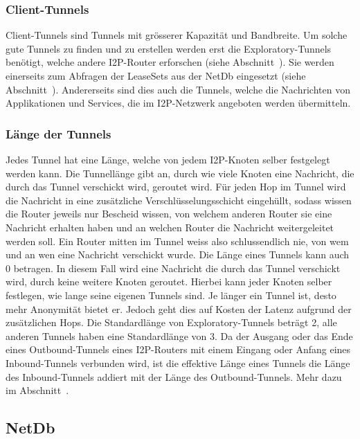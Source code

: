 \subsubsection{Client-Tunnels}

Client-Tunnels sind Tunnels mit grösserer Kapazität und Bandbreite. Um solche gute Tunnels zu finden und zu erstellen werden erst die Exploratory-Tunnels benötigt, welche andere I2P-Router erforschen (siehe Abschnitt~).
Sie werden einerseits zum Abfragen der LeaseSets aus der NetDb eingesetzt (siehe Abschnitt~).
Andererseits sind dies auch die Tunnels, welche die Nachrichten von Applikationen und Services, die im I2P-Netzwerk angeboten werden übermitteln.
\parencites[S.~4]{conrad_survey_2014}{noauthor_tunnelimplementierung_nodate}

\subsubsection{Länge der Tunnels}

Jedes Tunnel hat eine Länge, welche von jedem I2P-Knoten selber festgelegt werden kann.
Die Tunnellänge gibt an, durch wie viele Knoten eine Nachricht, die durch das Tunnel verschickt wird, geroutet wird.
Für jeden Hop im Tunnel wird die Nachricht in eine zusätzliche Verschlüsselungsschicht eingehüllt,
sodass wissen die Router jeweils nur Bescheid wissen, von welchem anderen Router sie eine Nachricht erhalten haben und an welchen Router die Nachricht weitergeleitet werden soll.
Ein Router mitten im Tunnel weiss also schlussendlich nie, von wem und an wen eine Nachricht verschickt wurde.
Die Länge eines Tunnels kann auch 0 betragen.
In diesem Fall wird eine Nachricht die durch das Tunnel verschickt wird, durch keine weitere Knoten geroutet.
Hierbei kann jeder Knoten selber festlegen, wie lange seine eigenen Tunnels sind.
Je länger ein Tunnel ist, desto mehr Anonymität bietet er.
Jedoch geht dies auf Kosten der Latenz aufgrund der zusätzlichen Hops.
Die Standardlänge von Exploratory-Tunnels beträgt 2, alle anderen Tunnels haben eine Standardlänge von 3.
Da der Ausgang oder das Ende eines Outbound-Tunnels eines I2P-Routers mit einem Eingang oder Anfang eines Inbound-Tunnels verbunden wird,
ist die effektive Länge eines Tunnels die Länge des Inbound-Tunnels addiert mit der Länge des Outbound-Tunnels. Mehr dazu im Abschnitt~.\\
\parencite{noauthor_i2p_nodate-3}

\subsection{NetDb}\label{sec:netdb}

